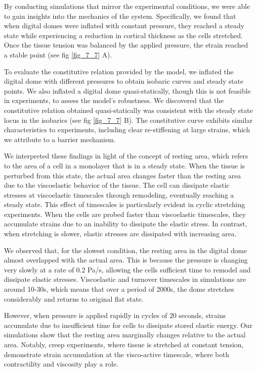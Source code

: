 By conducting simulations that mirror the experimental conditions, we were able to gain insights into the mechanics of the system. Specifically, we found that when digital domes were inflated with constant pressure, they reached a steady state while experiencing a reduction in cortical thickness as the cells stretched. Once the tissue tension was balanced by the applied pressure, the strain reached a stable point (see fig \ref{fig_7_7} A).

To evaluate the constitutive relation provided by the model, we inflated the digital dome with different pressures to obtain isobaric curves and steady state points. We also inflated a digital dome quasi-statically, though this is not feasible in experiments, to assess the model's robustness. We discovered that the constitutive relation obtained quasi-statically was consistent with the steady state locus in the isobarics  (see fig \ref{fig_7_7} B). The constitutive curve exhibits similar characteristics to experiments, including clear re-stiffening at large strains, which we attribute to a barrier mechanism.

We interpreted these findings in light of the concept of resting area, which refers to the area of a cell in a monolayer that is in a steady state. When the tissue is perturbed from this state, the actual area changes faster than the resting area due to the viscoelastic behavior of the tissue. The cell can dissipate elastic stresses at viscoelastic timescales through remodeling, eventually reaching a steady state. This effect of timescales is particularly evident in cyclic stretching experiments. When the cells are probed faster than viscoelastic timescales, they accumulate strains due to an inability to dissipate the elastic stress. In contrast, when stretching is slower, elastic stresses are dissipated with increasing area.

We observed that, for the slowest condition, the resting area in the digital dome almost overlapped with the actual area. This is because the pressure is changing very slowly at a rate of 0.2 Pa/s, allowing the cells sufficient time to remodel and dissipate elastic stresses. Viscoelastic and turnover timescales in simulations are around 10-30s, which means that over a period of 2000s, the dome stretches considerably and returns to original flat state.

However, when pressure is applied rapidly in cycles of 20 seconds, strains accumulate due to insufficient time for cells to dissipate stored elastic energy. Our simulations show that the resting area marginally changes relative to the actual area. Notably, creep experiments, where tissue is stretched at constant tension, demonstrate strain accumulation at the visco-active timescale, where both contractility and viscosity play a role. 

